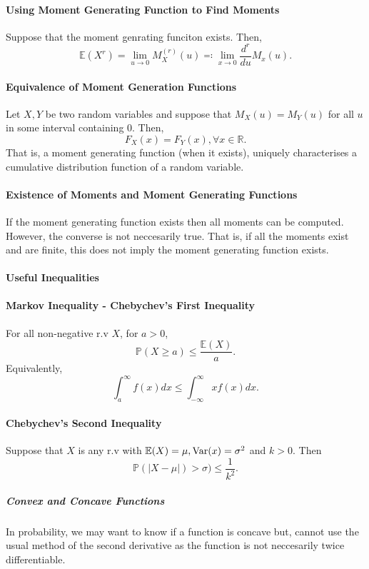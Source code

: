 \paragraph{Using Moment Generating Function to Find Moments}
Suppose that the moment genrating funciton exists. Then,
\[
    \mathbb{E}(X^r)
    = \lim_{u\to 0} M_X^(r)(u)
    \eqqcolon \lim_{x\to 0} \frac{d^r}{d u} M_x(u) .
\]

\paragraph{Equivalence of Moment Generation Functions}
Let \(X, Y\) be two random variables and 
suppose that \(M_X(u) = M_Y(u)\) for all \(u\) in some interval
containing \(0\). Then, \[
    F_X(x) = F_Y(x), \forall x \in \mathbb{R}.
\]
That is, a moment generating function (when it exists), uniquely
characterises a cumulative distribution function of a random variable.

\paragraph{Existence of Moments and Moment Generating Functions}
If the moment generating function exists then all moments can be computed.
However, the converse is not neccesarily true.
That is, if all the moments exist and are finite, this does not imply
the moment generating function exists.

\paragraph{Useful Inequalities}

\paragraph{Markov Inequality - Chebychev's First Inequality}
For all non-negative r.v \(X\), for \(a > 0\),
\[
    \mathbb{P}(X \geq a) \leq \frac{\mathbb{E}(X)}{a}.
\]
Equivalently, \[
    \int_{a}^{\infty} f(x) dx \leq \int_{-\infty}^{\infty} x f(x) dx.
\]

\paragraph{Chebychev's Second Inequality}
Suppose that \(X\) is any r.v with \(\mathbb{E}(X) = \mu, \mathrm{Var}(x) = \sigma^2\)
and \(k > 0\). Then \[
    \mathbb{P}(|X - \mu|) > \sigma) \leq \frac{1}{k^2}.
\]

\subparagraph{Convex and Concave Functions}
In probability, we may want to know if a function is concave but,
cannot use the usual method of the second derivative as the
function is not neccesarily twice differentiable.

